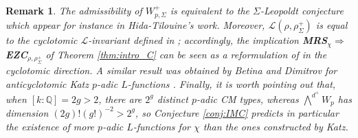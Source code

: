 \documentclass[12pt]{amsart}
\newcommand\bQ{\mathbb{Q}}
\newcommand\cL{\mathcal{L}}
\theoremstyle{defstyle}
\newtheorem{remark}[subsubsection]{Remark}
\theoremstyle{thmstyle}
\begin{document}
\begin{remark}
	The admissibility of $W_{p,\Sigma}^+$ is equivalent to the $\Sigma$-Leopoldt conjecture which appear for instance in Hida-Tilouine's work. Moreover,  $\cL(\rho,\rho^+_{\Sigma})$ is equal to the cyclotomic $\cL$-invariant defined in \cite[Def. 5.2]{buyukboduksakamoto}; accordingly, the implication \textbf{MRS}$_\chi \Longrightarrow$ \textbf{EZC}$_{\rho,\rho^+_\Sigma}$  of Theorem \ref{thm:intro_C} can be seen as a reformulation of \cite[Thm. 1.5]{buyukboduksakamoto} in the cyclotomic direction. A similar result was obtained by Betina and Dimitrov for anticyclotomic Katz $p$-adic $L$-functions \cite{betinadimitrovKatz}. Finally, it is worth pointing out that, when $[k:\bQ]=2g>2$, there are $2^g$ distinct $p$-adic CM types, whereas ${\bigwedge}^{d^+}W_p$ has dimension $(2g)!(g!)^{-2}>2^g$, so Conjecture \ref{conj:IMC} predicts in particular the existence of more $p$-adic $L$-functions for $\chi$ than the ones constructed by Katz. 
\end{remark}
\end{document}
